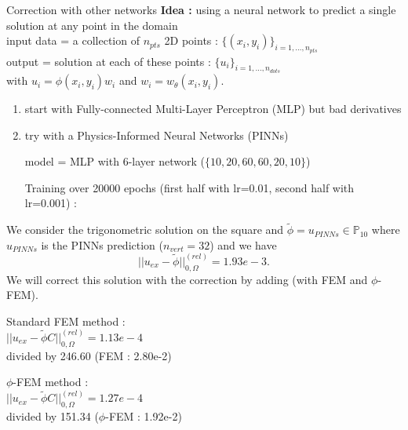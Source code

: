 \documentclass[compress,10pt,xcolor={table,dvipsnames},t]{beamer}
\begin{document}
	\begin{frame}[allowframebreaks]{Correction with other networks}
		\textbf{Idea :} using a neural network to predict a single solution at any point in the domain \\
		\quad input data = a collection of $n_{pts}$ 2D points : $\{(x_i,y_i)\}_{i=1,\dots, n_{pts}}$ \\
		\quad output = solution at each of these points : $\{u_i\}_{i=1,\dots,n_{dots}}$ \\
		\quad \quad with $u_i=\phi(x_i,y_i)w_i$ and $w_i=w_\theta(x_i,y_i)$.
		\begin{enumerate}[\ding{217}]
			\item start with Fully-connected Multi-Layer Perceptron (MLP) but bad derivatives
			\item try with a Physics-Informed Neural Networks (PINNs)
			\begin{minipage}{0.48\linewidth}
				model = MLP with 6-layer network ($\{10,20,60,60,20,10\}$)
				\centering
			\end{minipage}
			\begin{minipage}{0.48\linewidth}
				Training over 20000 epochs (first half with lr=0.01, second half with lr=0.001) :
				\centering
			\end{minipage}
		\end{enumerate}
		
		\newpage
		
		We consider the trigonometric solution on the square and $\tilde{\phi}=u_{PINNs}\in\mathbb{P}_{10}$ where $u_{PINNs}$ is the PINNs prediction ($n_{vert}=32$) and we have 
		\begin{equation*}
			||u_{ex}-\tilde{\phi}||_{0,\Omega}^{(rel)}=1.93e-3.
		\end{equation*}
		We will correct this solution with the correction by adding (with FEM and $\phi$-FEM).
		
		\begin{minipage}{0.48\linewidth}
			Standard FEM method :
			\centering
			 \\
			$||u_{ex}-\tilde{\phi}C||_{0,\Omega}^{(rel)}=1.13e-4$ \\
			divided by 246.60 (FEM : 2.80e-2)
		\end{minipage}
		\begin{minipage}{0.48\linewidth}
			$\phi$-FEM method :
			\centering
			 \\
			$||u_{ex}-\tilde{\phi}C||_{0,\Omega}^{(rel)}=1.27e-4$ \\
			divided by 151.34 ($\phi$-FEM : 1.92e-2)
			
		\end{minipage}
		
	\end{frame}
	
\end{document}
